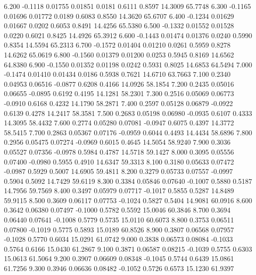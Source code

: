    6.200  -0.1118   0.01755   0.01851   0.0181   0.6111   0.8597  14.3009  65.7748
   6.300  -0.1165   0.01696   0.01772   0.0189   0.6083   0.8550  14.3620  65.6707
   6.400  -0.1234   0.01629   0.01667   0.0202   0.6053   0.8491  14.4256  65.5380
   6.500  -0.1332   0.01552   0.01528   0.0220   0.6021   0.8425  14.4926  65.3912
   6.600  -0.1443   0.01474   0.01376   0.0240   0.5990   0.8354  14.5594  65.2313
   6.700  -0.1572   0.01404   0.01210   0.0261   0.5959   0.8278  14.6262  65.0619
   6.800  -0.1560   0.01379   0.01200   0.0253   0.5945   0.8169  14.6562  64.8380
   6.900  -0.1550   0.01352   0.01198   0.0242   0.5931   0.8025  14.6853  64.5494
   7.000  -0.1474   0.01410   0.01434   0.0186   0.5938   0.7621  14.6710  63.7663
   7.100   0.2340   0.04953   0.06516  -0.0877   0.6208   0.4166  14.0926  58.1854
   7.200   0.2435   0.05016   0.06655  -0.0895   0.6192   0.4195  14.1281  58.2301
   7.300   0.2516   0.05069   0.06773  -0.0910   0.6168   0.4232  14.1790  58.2871
   7.400   0.2597   0.05128   0.06879  -0.0922   0.6139   0.4278  14.2417  58.3581
   7.500   0.2683   0.05198   0.06980  -0.0935   0.6107   0.4333  14.3095  58.4432
   7.600   0.2774   0.05280   0.07081  -0.0947   0.6075   0.4397  14.3772  58.5415
   7.700   0.2863   0.05367   0.07176  -0.0959   0.6044   0.4493  14.4434  58.6896
   7.800   0.2956   0.05475   0.07274  -0.0969   0.6015   0.4645  14.5054  58.9240
   7.900   0.3036   0.05527   0.07356  -0.0978   0.5984   0.4787  14.5718  59.1427
   8.000   0.3095   0.05556   0.07400  -0.0980   0.5955   0.4910  14.6347  59.3313
   8.100   0.3180   0.05633   0.07472  -0.0987   0.5929   0.5007  14.6905  59.4811
   8.200   0.3279   0.05733   0.07557  -0.0997   0.5904   0.5092  14.7429  59.6119
   8.300   0.3384   0.05846   0.07640  -0.1007   0.5880   0.5187  14.7956  59.7569
   8.400   0.3497   0.05979   0.07717  -0.1017   0.5855   0.5287  14.8489  59.9115
   8.500   0.3609   0.06117   0.07753  -0.1024   0.5827   0.5404  14.9081  60.0916
   8.600   0.3642   0.06380   0.07497  -0.1000   0.5782   0.5592  15.0046  60.3846
   8.700   0.3694   0.06440   0.07641  -0.1008   0.5779   0.5735  15.0110  60.6073
   8.800   0.3753   0.06511   0.07800  -0.1019   0.5775   0.5893  15.0189  60.8526
   8.900   0.3807   0.06568   0.07957  -0.1028   0.5770   0.6034  15.0291  61.0742
   9.000   0.3838   0.06573   0.08084  -0.1033   0.5764   0.6166  15.0430  61.2867
   9.100   0.3871   0.06587   0.08215  -0.1039   0.5755   0.6303  15.0613  61.5064
   9.200   0.3907   0.06609   0.08348  -0.1045   0.5744   0.6439  15.0861  61.7256
   9.300   0.3946   0.06636   0.08482  -0.1052   0.5726   0.6573  15.1230  61.9397
